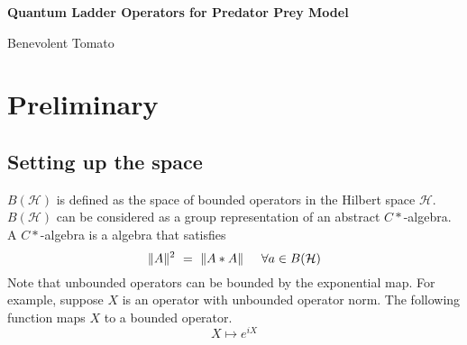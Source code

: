 \documentclass{article}
\newcommand{\HH}{\mathcal{H}}
\numberwithin{equation}{section}
\begin{document}
\begin{center}
    \Large
    \textbf{Quantum Ladder Operators for Predator Prey Model}

    \large
    Benevolent Tomato
\end{center}

\setcounter{section}{-1}

\section{Preliminary}

\subsection {Setting up the space}

$B(\HH)$ is defined as the space of bounded operators in the Hilbert 
space $\HH$. $B(\HH)$ can be considered as a group representation of 
an abstract $C*$-algebra. A $C*$-algebra is a algebra that satisfies
\begin{equation}
    \|A\|^2 \ = \  \|A*A\| \hspace{5mm} \forall a \in B(\HH)
\end{equation}
Note that unbounded operators can be bounded by the exponential map. 
For example, suppose $X$ is an operator with unbounded operator norm. 
The following function maps $X$ to a bounded operator. 
\begin{equation}
    X \mapsto e^{iX}
\end{equation}
\end{document}
